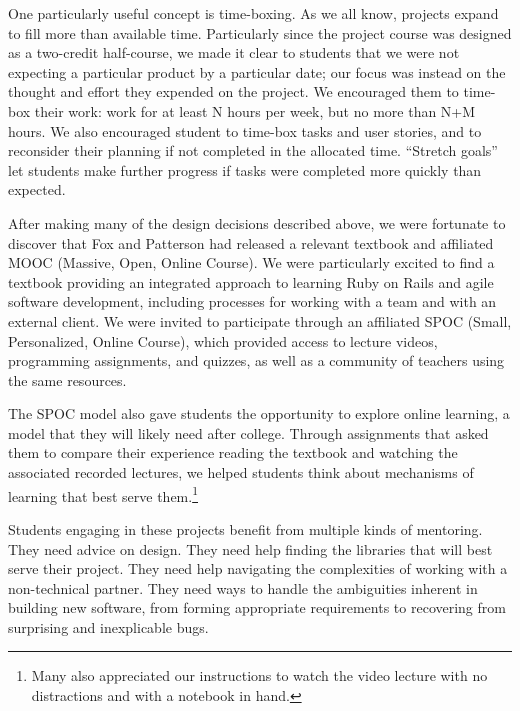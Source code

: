 One particularly useful concept is time-boxing.
As we all know, projects expand to fill more than available time.
Particularly since the project course was designed as a two-credit 
half-course, we made it clear to students that we were not expecting
a particular product by a particular date; our focus was instead on the
thought and effort they expended on the project.  We encouraged them
to time-box their work: work for at least N hours per week, but no more
than N+M hours.  We also encouraged student to time-box tasks 
and user stories, and to reconsider their planning if not completed in the 
allocated time.  ``Stretch goals'' let students make further progress 
if tasks were completed more quickly than expected.

After making many of the design decisions described above, we were
fortunate to discover that Fox and Patterson had released a relevant
textbook \cite{saasbook} and affiliated MOOC (Massive, Open, Online
Course).  
We were particularly excited to find a textbook providing an integrated
approach to learning Ruby on Rails and agile software development, 
including processes for working with a team and with an external client.
We were invited to participate through an affiliated SPOC
(Small, Personalized, Online Course), which provided access to lecture 
videos, programming assignments, and quizzes, 
as well as a community of teachers using the same resources.

The SPOC model also gave students the
opportunity to explore online learning, a model
that they will likely need after college.  Through
assignments that asked them to compare their experience reading the
textbook and watching the associated recorded lectures, we
helped students think about mechanisms of learning that
best serve them.\footnote{Many also appreciated our instructions
to watch the video lecture with no distractions and with a notebook
in hand.} 

Students engaging in these projects benefit from multiple
kinds of mentoring.  They need advice on design.  They need
help finding the libraries that will 
best serve their project.  They need help navigating the complexities
of working with a non-technical partner.  They need
ways to handle the ambiguities inherent in building new software,
from forming appropriate requirements to recovering from surprising
and inexplicable bugs.


